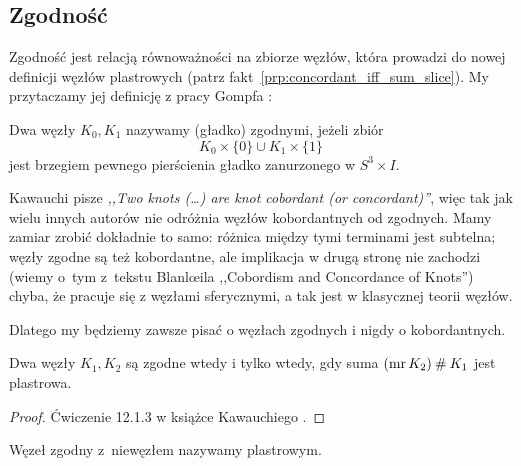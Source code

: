 
\subsection{Zgodność}
Zgodność jest relacją równoważności na zbiorze węzłów, która prowadzi do nowej definicji węzłów plastrowych (patrz fakt~\ref{prp:concordant_iff_sum_slice}).
My przytaczamy jej definicję z pracy Gompfa \cite{gompf1986}:

\begin{definition}[zgodność]
%
%
    Dwa węzły $K_0, K_1$ nazywamy (gładko) zgodnymi, jeżeli zbiór
    \begin{equation}
        K_0 \times \{0\} \cup K_1 \times \{1\}
    \end{equation}
    jest brzegiem pewnego pierścienia gładko zanurzonego w $S^3 \times I$.
\end{definition}

Kawauchi \cite[s. 156]{kawauchi1996} pisze \emph{,,Two knots (…) are knot cobordant (or concordant)''}, więc tak jak wielu innych autorów nie odróżnia węzłów kobordantnych od zgodnych.
Mamy zamiar zrobić dokładnie to samo: różnica między tymi terminami jest subtelna; węzły zgodne są też kobordantne, ale implikacja w drugą stronę nie zachodzi (wiemy o~tym z~tekstu Blanlœila ,,Cobordism and Concordance of Knots'') chyba, że pracuje się z węzłami sferycznymi, a tak jest w klasycznej teorii węzłów.
%

Dlatego my będziemy zawsze pisać o węzłach zgodnych i nigdy o kobordantnych.

\begin{proposition}
\label{prp:concordant_iff_sum_slice}%
    Dwa węzły $K_1, K_2$ są zgodne wtedy i tylko wtedy, gdy suma $(\operatorname{mr} K_2) \mathbin{\#} K_1$ jest plastrowa.
%
%
\end{proposition}

\begin{proof}
    Ćwiczenie 12.1.3 w książce Kawauchiego \cite{kawauchi1996}.
\end{proof}

\begin{definition}
    Węzeł zgodny z~niewęzłem nazywamy plastrowym.
%
\end{definition}

